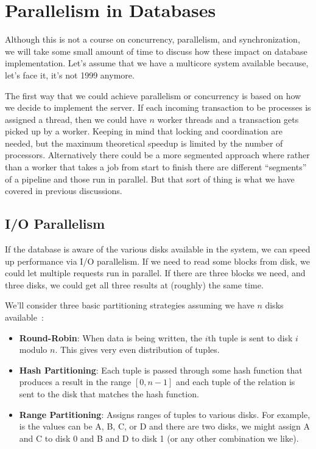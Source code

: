 \documentclass[a4paper]{report}
\begin{document}

\section*{Parallelism in Databases}

Although this is not a course on concurrency, parallelism, and synchronization, we will take some small amount of time to discuss how these impact on database implementation.  Let's assume that we have a multicore system available because, let's face it, it's not 1999 anymore.

The first way that we could achieve parallelism or concurrency is based on how we decide to implement the server. If each incoming transaction to be processes is assigned a thread, then we could have $n$ worker threads and a transaction gets picked up by a worker. Keeping in mind that locking and coordination are needed, but the maximum theoretical speedup is limited by the number of processors. Alternatively there could be a more segmented approach where rather than a worker that takes a job from start to finish there are different ``segments'' of a pipeline and those run in parallel. But that sort of thing is what we have covered in previous discussions. 


\subsection*{I/O Parallelism} If the database is aware of the various disks available in the system, we can speed up performance via I/O parallelism. If we need to read some blocks from disk, we could let multiple requests run in parallel. If there are three blocks we need, and three disks, we could get all three results at (roughly) the same time. 

We'll consider three basic partitioning strategies assuming we have $n$ disks available~\cite{dsc}:
\begin{itemize}
	\item \textbf{Round-Robin}: When data is being written, the $i$th tuple is sent to disk $i$ modulo $n$. This gives very even distribution of tuples.
	\item \textbf{Hash Partitioning}: Each tuple is passed through some hash function that produces a result in the range $[0, n-1]$ and each tuple of the relation is sent to the disk that matches the hash function.
	\item \textbf{Range Partitioning}: Assigns ranges of tuples to various disks. For example, is the values can be A, B, C, or D and there are two disks, we might assign A and C to disk 0 and B and D to disk 1 (or any other combination we like).
\end{itemize}
\end{document}
